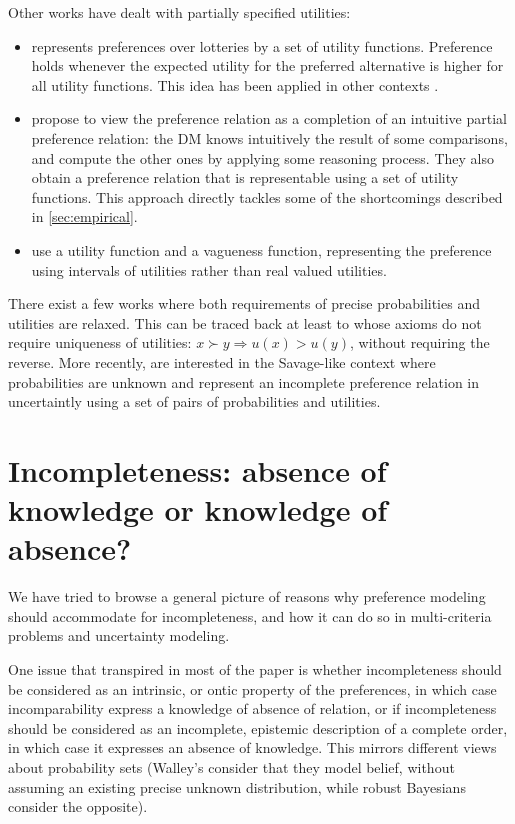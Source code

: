 \documentclass[french, english]{llncs}
\begin{document}
	Other works have dealt with partially specified utilities:
	\begin{itemize}
		\item \citet{dubra_expected_2004} represents preferences over lotteries by a set of utility functions. Preference holds whenever the expected utility for the preferred alternative is higher for all utility functions. This idea has been applied in other contexts \citep{ok_utility_2002}.
		\item \citet{dubra_model_2002} propose to view the preference relation as a completion of an intuitive partial preference relation: the \ac{DM} knows intuitively the result of some comparisons, and compute the other ones by applying some reasoning process. They also obtain a preference relation that is representable using a set of utility functions. This approach directly tackles some of the shortcomings described in \cref{sec:empirical}.
		\item \citet{manzini_representation_2008} use a utility function and a vagueness function, representing the preference using intervals of utilities rather than real valued utilities. %
	\end{itemize}

	There exist a few works where both requirements of precise probabilities and utilities are relaxed. This can be traced back at least to \citet{aumann_utility_1962} whose axioms do not require uniqueness of utilities: $x \succ y ⇒ u(x) > u(y)$, without requiring the reverse. More recently, \citet{galaabaatar_subjective_2013} are interested in the Savage-like context where probabilities are unknown and represent an incomplete preference relation in uncertaintly using a set of pairs of probabilities and utilities.


	\section{Incompleteness: absence of knowledge or knowledge of absence?}
	
	We have tried to browse a general picture of reasons why preference modeling should accommodate for incompleteness, and how it can do so in multi-criteria problems and uncertainty modeling. 
	
	One issue that transpired in most of the paper is whether incompleteness should be considered as an intrinsic, or ontic property of the preferences, in which case incomparability express a knowledge of absence of relation, or if incompleteness should be considered as an incomplete, epistemic description of a complete order, in which case it expresses an absence of knowledge. This mirrors different views about probability sets (Walley's consider that they model belief, without assuming an existing precise unknown distribution, while robust Bayesians consider the opposite). 
	
\end{document}

